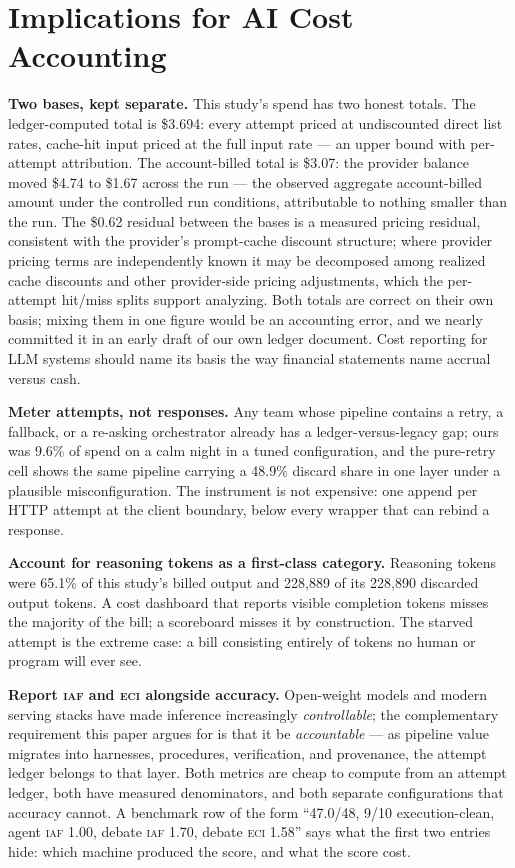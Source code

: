 \documentclass[11pt]{article}
\newcommand{\iaf}{\textsc{iaf}}
\newcommand{\eci}{\textsc{eci}}
\begin{document}
\section{Implications for AI Cost Accounting}\label{sec:accounting}

\textbf{Two bases, kept separate.} This study's spend has two honest
totals. The ledger-computed total is \$3.694: every attempt priced at
undiscounted direct list rates, cache-hit input priced at the full
input rate --- an upper bound with per-attempt attribution. The
account-billed total is \$3.07: the provider balance moved \$4.74 to
\$1.67 across the run --- the observed aggregate account-billed amount
under the controlled run conditions, attributable to nothing smaller
than the run. The \$0.62 residual between the bases is a measured
pricing residual, consistent with the provider's prompt-cache discount
structure; where provider pricing terms are independently known it may
be decomposed among realized cache discounts and other provider-side
pricing adjustments, which the per-attempt hit/miss splits support
analyzing. Both totals are correct on their own basis; mixing them in
one figure would be an accounting error, and we nearly committed it
in an early draft of our own ledger document. Cost reporting for LLM
systems should name its basis the way financial statements name
accrual versus cash.

\textbf{Meter attempts, not responses.} Any team whose pipeline
contains a retry, a fallback, or a re-asking orchestrator already has
a ledger-versus-legacy gap; ours was 9.6\% of spend on a calm night in
a tuned configuration, and the pure-retry cell shows the same pipeline
carrying a 48.9\% discard share in one layer under a plausible
misconfiguration. The instrument is not expensive: one append per
HTTP attempt at the client boundary, below every wrapper that can
rebind a response.

\textbf{Account for reasoning tokens as a first-class category.}
Reasoning tokens were 65.1\% of this study's billed output and
228{,}889 of its 228{,}890 discarded output tokens. A cost dashboard that reports visible
completion tokens misses the majority of the bill; a scoreboard
misses it by construction. The starved attempt is the extreme case: a
bill consisting entirely of tokens no human or program will ever see.

\textbf{Report \iaf{} and \eci{} alongside accuracy.} Open-weight
models and modern serving stacks have made inference increasingly
\emph{controllable}; the complementary requirement this paper argues
for is that it be \emph{accountable} --- as pipeline value migrates
into harnesses, procedures, verification, and provenance, the attempt
ledger belongs to that layer. Both metrics
are cheap to compute from an attempt ledger, both have measured
denominators, and both separate configurations that accuracy cannot.
A benchmark row of the form ``47.0/48, 9/10 execution-clean, agent
\iaf{} 1.00, debate \iaf{} 1.70, debate \eci{} 1.58'' says what the
first two entries hide:
which machine produced the score, and what the score cost.
\end{document}
